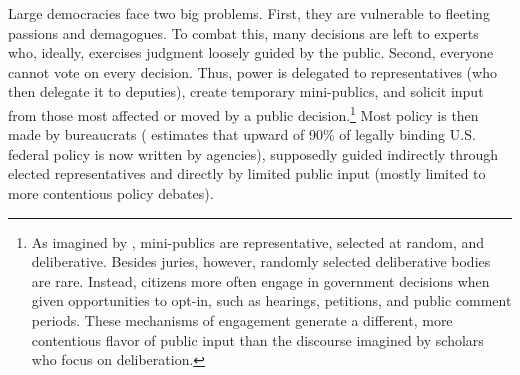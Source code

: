 
Large democracies face two big problems. First, they are vulnerable to fleeting passions and demagogues. To combat this, many decisions are left to experts who, ideally, %
exercises judgment loosely guided by the public. Second, everyone cannot vote on every decision. Thus, power is delegated to representatives (who then delegate it to deputies), create temporary mini-publics, and solicit input from those most affected or moved by a public decision.\footnote{
As imagined by \citet{Dahl1989}, mini-publics are representative, selected at random, and deliberative. Besides juries, however, randomly selected deliberative bodies are rare. Instead, citizens more often engage in government decisions when given opportunities to opt-in, such as hearings, petitions, and public comment periods. These mechanisms of engagement generate a different, more contentious flavor of public input than the discourse imagined by scholars who focus on deliberation.
}
Most policy is then made by bureaucrats (\citet{West2013} estimates that upward of 90\% of legally binding U.S. federal policy is now written by agencies), supposedly guided indirectly through elected representatives and directly by limited public input (mostly limited to more contentious policy debates).




